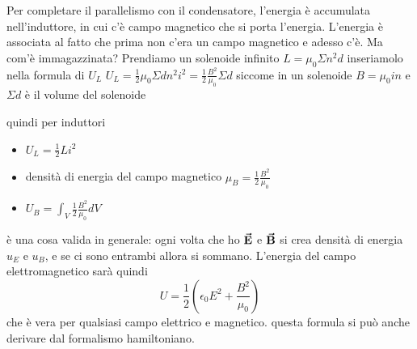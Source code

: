 Per completare il parallelismo con il condensatore, l'energia è accumulata nell'induttore, in cui c'è campo magnetico che si porta l'energia. L'energia è associata al fatto che prima non c'era un campo magnetico e adesso c'è. Ma com'è immagazzinata? Prendiamo un solenoide infinito
	$L=\mu_0\Sigma n^2d$
inseriamolo nella formula di $U_L$
$U_L=\frac{1}{2}\mu_0\Sigma dn^2i^2=\frac{1}{2}\frac{B^2}{\mu_0}\Sigma d$
	siccome in un solenoide $B=\mu_0in$ e $\Sigma d$ è il volume del solenoide


quindi per induttori 
\begin{itemize}
	\item$U_L=\frac{1}{2}Li^2$
	\item densità di energia del campo magnetico $\mu_B=\frac{1}{2}\frac{B^2}{\mu_0}$
	\item $U_B=\int_V \frac{1}{2}\frac{B^2}{\mu_0}dV$
\end{itemize}

è una cosa valida in generale: ogni volta che ho $\vb*{\va{E}}$ e $\vb*{\va{B}}$ si crea densità di energia $u_E$ e $u_B$, e se ci sono entrambi allora si sommano.
L'energia del campo elettromagnetico sarà quindi 
\begin{equation}
	U=\frac{1}{2}\left( \epsilon_0 E^2 + \frac{B^2}{\mu_0} \right)
\end{equation}
che è vera per qualsiasi campo elettrico e magnetico. questa formula si può anche derivare dal formalismo hamiltoniano.


